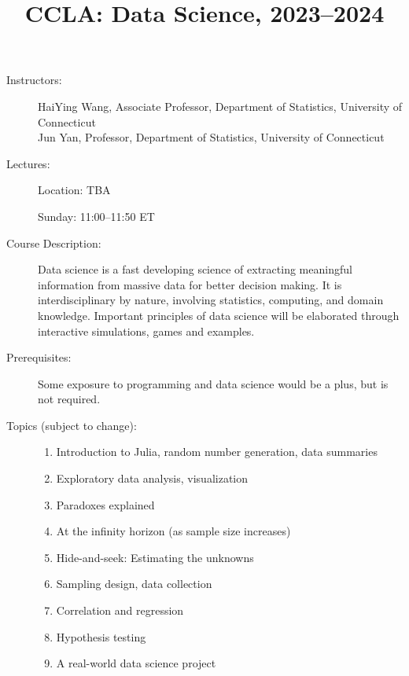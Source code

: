 \documentclass[onecolumn, hidelinks, 12pt]{article}
\begin{document}
\title{CCLA: Data Science, 2023--2024}
\date{} %
\maketitle

\thispagestyle{fancy}


\begin{description}
\item[Instructors:] \hspace{0pt}
  
  HaiYing Wang, Associate Professor, Department of Statistics, University of Connecticut\\
  Jun Yan, Professor, Department of Statistics, University of Connecticut\\
  
\item[Lectures:] \hspace{0pt}

  Location: TBA
  
  Sunday: 11:00--11:50 ET
  

\item[Course Description:]
Data science is a fast developing science of extracting meaningful
information from massive data for better decision making. It is
interdisciplinary by nature, involving statistics, computing, and
domain knowledge. Important principles of data science will be
elaborated through interactive simulations, games and examples.

\item[Prerequisites:]
  Some exposure to programming and data science would be a plus,
  but is not required.  

\item[Topics (subject to change):] \hspace{0pt}
  
\begin{enumerate} %
\item
  Introduction to Julia, random number generation, data summaries
\item
  Exploratory data analysis, visualization
\item
  Paradoxes explained
\item
  At the infinity horizon (as sample size increases)
\item
  Hide-and-seek: Estimating the unknowns
\item
  Sampling design, data collection
\item
  Correlation and regression
\item
  Hypothesis testing
\item
  A real-world data science project
\end{enumerate}


\end{description}
\end{document}
